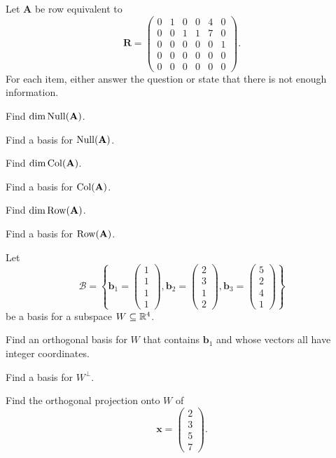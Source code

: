 \documentclass[11pt,oneside]{article}
\begin{document}
\begin{problem}
Let $\mathbf A$ be row equivalent to
\[
\mathbf R=
\begin{pmatrix}
0&1&0&0&4&0\\
0&0&1&1&7&0\\
0&0&0&0&0&1\\
0&0&0&0&0&0\\
0&0&0&0&0&0
\end{pmatrix}.
\]
For each item, either answer the question or state that there is not enough information.
\begin{problemsubparts}
\item Find $\dim\operatorname{Null}(\mathbf A)$.
\item Find a basis for $\operatorname{Null}(\mathbf A)$.
\item Find $\dim\operatorname{Col}(\mathbf A)$.
\item Find a basis for $\operatorname{Col}(\mathbf A)$.
\item Find $\dim\operatorname{Row}(\mathbf A)$.
\item Find a basis for $\operatorname{Row}(\mathbf A)$.
\end{problemsubparts}
\end{problem}

\begin{problem}
Let
\[
\mathcal B=
\left\{
\mathbf b_1=
\begin{pmatrix}1\\1\\1\\1\end{pmatrix},
\mathbf b_2=
\begin{pmatrix}2\\3\\1\\2\end{pmatrix},
\mathbf b_3=
\begin{pmatrix}5\\2\\4\\1\end{pmatrix}
\right\}
\]
be a basis for a subspace $W\subseteq\mathbb{R}^4$.
\begin{problemsubparts}
\item Find an orthogonal basis for $W$ that contains $\mathbf b_1$ and whose vectors all have integer coordinates.
\item Find a basis for $W^\perp$.
\item Find the orthogonal projection onto $W$ of
\[
\mathbf x=
\begin{pmatrix}2\\3\\5\\7\end{pmatrix}.
\]
\end{problemsubparts}
\end{problem}
\end{document}
